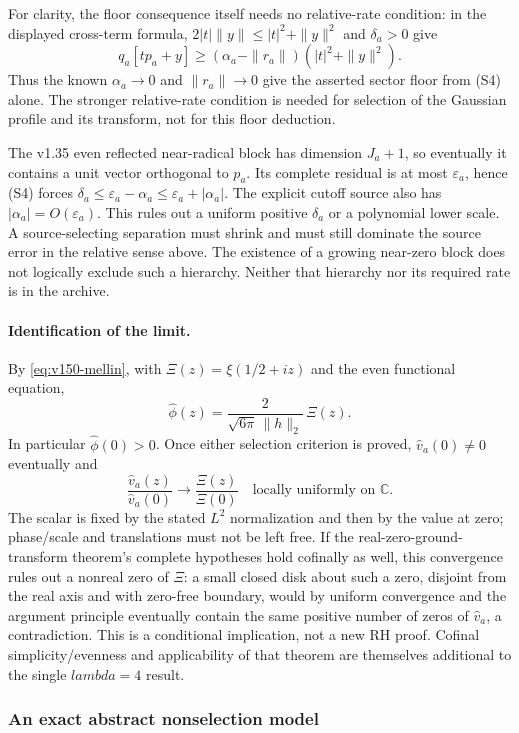 \documentclass[11pt]{article}
\def\lambda{lambda}%
\theoremstyle{remark}
\begin{document}
For clarity, the floor consequence itself needs no relative-rate
condition: in the displayed cross-term formula,
$2|t|\|y\|\le |t|^2+\|y\|^2$ and $\delta_a>0$ give
\[
 q_a[tp_a+y]\ge(\alpha_a-\|r_a\|)(|t|^2+\|y\|^2).
\]
Thus the known $\alpha_a\to0$ and $\|r_a\|\to0$ give the asserted
sector floor from (S4) alone. The stronger relative-rate condition
is needed for selection of the Gaussian profile and its transform,
not for this floor deduction.

The v1.35 even reflected near-radical block has dimension $J_a+1$,
so eventually it contains a unit vector orthogonal to $p_a$. Its complete
residual is at most $\varepsilon_a$, hence (S4) forces
$\delta_a\le\varepsilon_a-\alpha_a\le\varepsilon_a+|\alpha_a|$.
The explicit cutoff source also has $|\alpha_a|=O(\varepsilon_a)$.
This rules out a uniform positive $\delta_a$ or a polynomial lower scale.
A source-selecting separation must shrink and must still dominate the
source error in the relative sense above. The existence of a growing
near-zero block does not logically exclude such a hierarchy. Neither
that hierarchy nor its required rate is in the archive.

\paragraph{Identification of the limit.}
By \eqref{eq:v150-mellin}, with
$\Xi(z)=\xi(1/2+iz)$ and the even functional equation,
\[
 \widehat\phi(z)=\frac{2}{\sqrt{6\pi}\,\|h\|_2}\,\Xi(z).
\]
In particular $\widehat\phi(0)>0$. Once either selection criterion is
proved, $\widehat v_a(0)\ne0$ eventually and
\[
 \frac{\widehat v_a(z)}{\widehat v_a(0)}
 \longrightarrow\frac{\Xi(z)}{\Xi(0)}
 \quad\text{locally uniformly on }\mathbb C.
\]
The scalar is fixed by the stated $L^2$ normalization and then by the
value at zero; phase/scale and translations must not be left free.
If the real-zero-ground-transform theorem's complete hypotheses hold
cofinally as well, this convergence rules out a nonreal zero of $\Xi$:
a small closed disk about such a zero, disjoint from the real axis and
with zero-free boundary, would by uniform convergence and the argument
principle eventually contain the same positive number of zeros of
$\widehat v_a$, a contradiction. This is a conditional implication,
not a new RH proof. Cofinal simplicity/evenness and applicability of
that theorem are themselves additional to the single $\lambda=4$ result.

\subsubsection{An exact abstract nonselection model}
\end{document}

